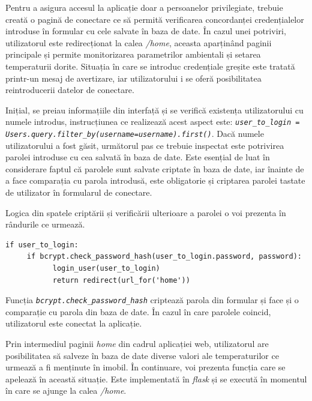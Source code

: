 	Pentru a asigura accesul la aplicație doar a persoanelor privilegiate, trebuie creată o pagină de conectare ce să permită verificarea concordanței credențialelor introduse în formular cu cele salvate în baza de date. În cazul unei potriviri, utilizatorul este redirecționat la calea \textit{/home}, aceasta aparținând paginii principale și permite monitorizarea parametrilor ambientali și setarea  temperaturii dorite. Situația în care se introduc credențiale greșite este tratată printr-un mesaj de avertizare, iar utilizatorului i se oferă posibilitatea reintroducerii datelor de conectare.

	Inițial, se preiau informațiile din interfață și se verifică existența utilizatorului cu numele introdus, instrucțiunea ce realizează acest aspect este: \textit{\texttt{user\_to\_login = Users.query.filter\_by(username=username).first()}}. Dacă numele utilizatorului a fost găsit, următorul pas ce trebuie inspectat este potrivirea parolei introduse cu cea salvată în baza de date. Este esențial de luat în considerare faptul că parolele sunt salvate criptate în baza de date, iar înainte de a face comparația cu parola introdusă, este obligatorie și criptarea parolei tastate de utilizator în formularul de conectare. 

	Logica din spatele criptării și verificării ulterioare a parolei o voi prezenta în rândurile ce urmează.

\vspace{1em}	
\begin{lstlisting}	
if user_to_login:
     if bcrypt.check_password_hash(user_to_login.password, password):
           login_user(user_to_login)
           return redirect(url_for('home'))
\end{lstlisting}
\vspace{1em} 	

	Funcția \textit{\texttt{bcrypt.check\_password\_hash}} criptează parola din formular și face și o comparație cu parola din baza de date. În cazul în care parolele coincid, utilizatorul este conectat la aplicație.
  
\vspace{2em}

	Prin intermediul paginii \textit{home} din cadrul aplicației web, utilizatorul are posibilitatea să salveze în baza de date diverse valori ale temperaturilor ce urmează a fi menținute în imobil. În continuare, voi prezenta funcția care se apelează în această situație. Este implementată în \textit{flask} și se execută în momentul în care se ajunge la calea \textit{/home}. 

